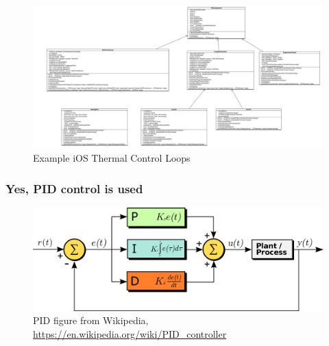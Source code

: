 \documentclass{beamer}
\begin{document}
\begin{frame}
  \begin{figure}
    \includegraphics[width=.8\textwidth,keepaspectratio]{iOS-thermal.pdf}
    \caption{Example iOS Thermal Control Loops}
  \end{figure}
\end{frame}

\begin{frame}
  \frametitle{Yes, PID control is used}
  \begin{figure}
    \includegraphics[width=.8\textwidth,keepaspectratio]{PID_en.png}
    \caption{PID figure from Wikipedia, \url{https://en.wikipedia.org/wiki/PID_controller}}
  \end{figure}
\end{frame}
\end{document}
